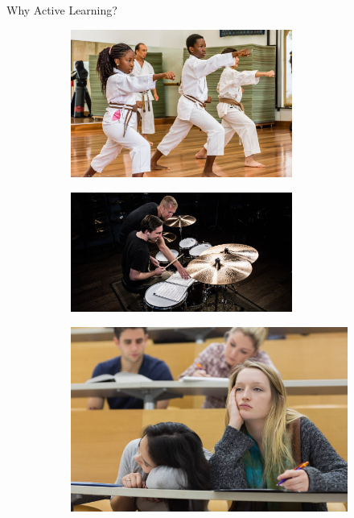 \documentclass[t, aspectratio = 137, xcolor=dvipsnames,table,compress]{beamer}
\begin{document}
 
\begin{frame}{Why Active Learning?}


\begin{figure}[h!]
    \centering
    \begin{subfigure}{0.45\textwidth}
        \includegraphics[width=0.8\textwidth]{images/karate} 
    \end{subfigure}
    \hfill
    \begin{subfigure}{0.45\textwidth}
        \includegraphics[width=0.8\textwidth]{images/drums} 
    \end{subfigure}
    
    \begin{subfigure}{0.5\textwidth}
        \centering
        \includegraphics[width=.7\textwidth]{images/bored_student} %
    \end{subfigure}
    
\end{figure}
	
\end{frame}
\end{document}
